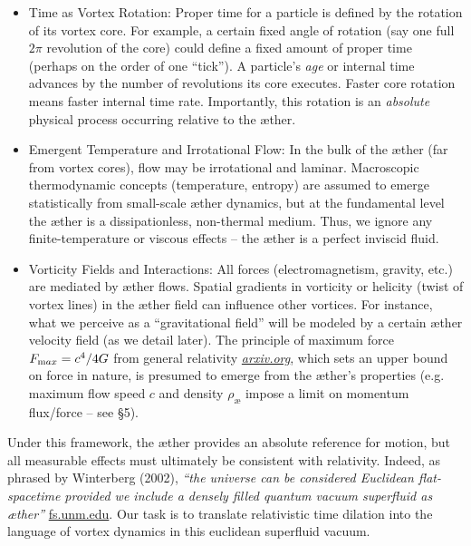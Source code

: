 \documentclass[aps,preprint,superscriptaddress]{revtex4}
\begin{document}
\begin{itemize}
        \item
        Time as Vortex Rotation: Proper time for a particle is defined by the rotation of its vortex core. For example, a certain fixed angle of rotation (say one full $2\pi$ revolution of the core) could define a fixed amount of proper time (perhaps on the order of one “tick”). A particle’s \textit{age} or internal time advances by the number of revolutions its core executes. Faster core rotation means faster internal time rate. Importantly, this rotation is an \textit{absolute} physical process occurring relative to the æther.

        \item
        Emergent Temperature and Irrotational Flow: In the bulk of the æther (far from vortex cores), flow may be irrotational and laminar. Macroscopic thermodynamic concepts (temperature, entropy) are assumed to emerge statistically from small-scale æther dynamics, but at the fundamental level the æther is a dissipationless, non-thermal medium. Thus, we ignore any finite-temperature or viscous effects – the æther is a perfect inviscid fluid.

        \item
        Vorticity Fields and Interactions: All forces (electromagnetism, gravity, etc.) are mediated by æther flows. Spatial gradients in vorticity or helicity (twist of vortex lines) in the æther field can influence other vortices. For instance, what we perceive as a “gravitational field” will be modeled by a certain æther velocity field (as we detail later). The principle of maximum force $F_{\textrm max}=c^4/4G$ from general relativity
        \href{https://arxiv.org/abs/2205.06302#:~:text=the%20principle%20of%20maximum%20force,The%20limits%20illuminate}{\textit{arxiv.org}}, which sets an upper bound on force in nature, is presumed to emerge from the æther’s properties (e.g. maximum flow speed $c$ and density $\rho_\text{\ae}$ impose a limit on momentum flux/force – see §5).
    \end{itemize}

    Under this framework, the æther provides an absolute reference for motion, but all measurable effects must ultimately be consistent with relativity. Indeed, as phrased by Winterberg (2002), \textit{“the universe can be considered Euclidean flat-spacetime provided we include a densely filled quantum vacuum superfluid as æther”}
    \href{https://fs.unm.edu/QuantizationDiscretization.pdf#:~:text=Winterberg%20,an%20equal%20number%20of%20positive}{fs.unm.edu}. Our task is to translate relativistic time dilation into the language of vortex dynamics in this euclidean superfluid vacuum.
\end{document}
